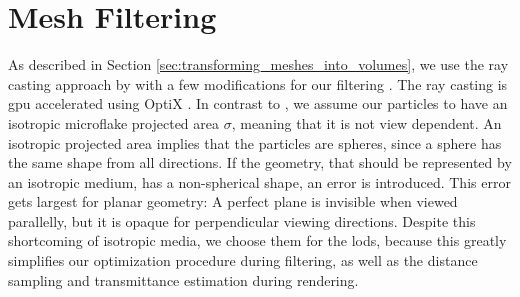 \section{Mesh Filtering}
\label{sec:mesh_filtering}
As described in Section \ref{sec:transforming_meshes_into_volumes}, we use the ray casting approach by \citeauthor{hybrid_mesh_volume_lods} with a few modifications for our filtering \cite{hybrid_mesh_volume_lods}.
The ray casting is \ac{gpu} accelerated using OptiX \cite{parker_optix}.
In contrast to \citeauthor{hybrid_mesh_volume_lods}, we assume our particles to have an isotropic microflake projected area $\sigma$, meaning that it is not view dependent.
An isotropic projected area implies that the particles are spheres, since a sphere has the same shape from all directions.
If the geometry, that should be represented by an isotropic medium, has a non-spherical shape, an error is introduced.
This error gets largest for planar geometry: A perfect plane is invisible when viewed parallelly, but it is opaque for perpendicular viewing directions.
Despite this shortcoming of isotropic media, we choose them for the \acsp{lod}, because this greatly simplifies our optimization procedure during filtering, as well as the distance sampling and transmittance estimation during rendering.

